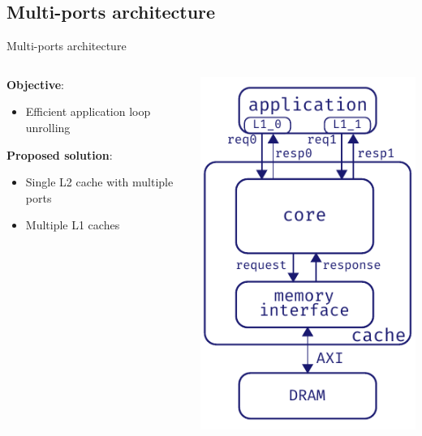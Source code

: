 \documentclass[aspectratio=169]{beamer}
\begin{document}
\subsection{Multi-ports architecture}
\begin{frame}{Multi-ports architecture}
	\begin{columns}
		\begin{column}{.5\textwidth}
			\textbf{Objective}:
			\begin{itemize}
				\item Efficient application loop unrolling
			\end{itemize}

			\bigskip
			\textbf{Proposed solution}:
			\begin{itemize}
				\item Single L2 cache with multiple ports
				\item Multiple L1 caches
			\end{itemize}
		\end{column}
		\begin{column}{.5\textwidth}
			\begin{center}
			\includegraphics[height=.7\textheight]{multi_ports_arch}
			\end{center}
		\end{column}
	\end{columns}
\end{frame}
\end{document}
